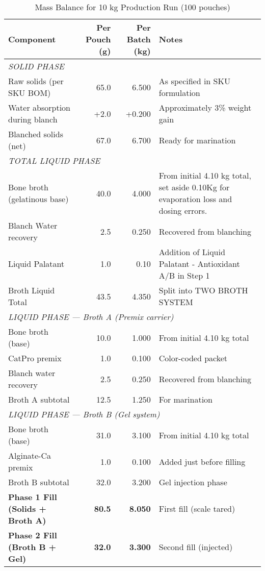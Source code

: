 \begin{table}[h]
\centering
\caption{Mass Balance for 10 kg Production Run (100 pouches)}
\label{tab:mass_balance}
\begin{tabular}{@{}lrrl@{}}
\toprule
\textbf{Component} & \textbf{Per Pouch (g)} & \textbf{Per Batch (kg)} & \textbf{Notes} \\
\midrule
\multicolumn{4}{l}{\textit{SOLID PHASE}} \\
Raw solids (per SKU BOM) & 65.0 & 6.500 & As specified in SKU formulation \\
Water absorption during blanch & +2.0 & +0.200 & Approximately 3\% weight gain \\
Blanched solids (net) & 67.0 & 6.700 & Ready for marination \\
\midrule
\multicolumn{4}{l}{\textit{TOTAL LIQUID PHASE}} \\
Bone broth (gelatinous base) & 40.0 & 4.000 & From initial 4.10 kg total, set aside 0.10Kg for evaporation loss and dosing errors. \\
Blanch Water recovery & 2.5 & 0.250 & Recovered from blanching \\
Liquid Palatant & 1.0 & 0.10 & Addition of Liquid Palatant - Antioxidant A/B in  Step 1 \\
Broth Liquid Total  & 43.5 & 4.350 & Split into TWO BROTH SYSTEM \\
\midrule
\multicolumn{4}{l}{\textit{LIQUID PHASE --- Broth A (Premix carrier)}} \\
Bone broth (base) & 10.0 & 1.000 & From initial 4.10 kg total \\
CatPro premix & 1.0 & 0.100 & Color-coded packet \\
Blanch water recovery & 2.5 & 0.250 & Recovered from blanching \\
Broth A subtotal & 12.5 & 1.250 & For marination \\
\midrule
\multicolumn{4}{l}{\textit{LIQUID PHASE --- Broth B (Gel system)}} \\
Bone broth (base) & 31.0 & 3.100 & From initial 4.10 kg total \\
Alginate-Ca premix & 1.0 & 0.100 & Added just before filling \\
Broth B subtotal & 32.0 & 3.200 & Gel injection phase \\
\midrule
\textbf{Phase 1 Fill (Solids + Broth A)} & \textbf{80.5} & \textbf{8.050} & First fill (scale tared) \\
\textbf{Phase 2 Fill (Broth B + Gel)} & \textbf{32.0} & \textbf{3.300} & Second fill (injected) \\

\end{tabular}
\end{table}
